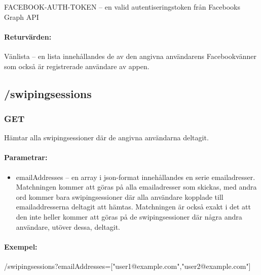 \documentclass{article}
\begin{document}
\begin{description}
    \item FACEBOOK-AUTH-TOKEN -- en valid autentiseringstoken från Facebooks Graph API
\end{description}

\paragraph{Returvärden:}
\label{par:facebook_login_returv_rden_}

\begin{description}
    \item Vänlista -- en lista innehållandes de av den angivna användarens Facebookvänner som också är registrerade användare av appen.
\end{description}

\subsection*{/swipingsessions}

\subsubsection*{GET}

Hämtar alla swipingsessioner där de angivna användarna deltagit.

\paragraph{Parametrar:}

\begin{itemize}
	
	\item emailAddresses -- en array i json-format innehållandes en serie emailadresser. Matchningen kommer att göras på alla
		emailadresser som skickas, med andra ord kommer bara swipingsessioner där alla användare kopplade till emailaddresserna
		deltagit att hämtas. Matchningen är också exakt i det att den inte heller kommer att göras på de swipingsessioner där
		några andra användare, utöver dessa, deltagit.

\end{itemize}

\paragraph{Exempel:} /swipingsessions?emailAddresses=["user1@example.com","user2@example.com"] 
\end{document}
